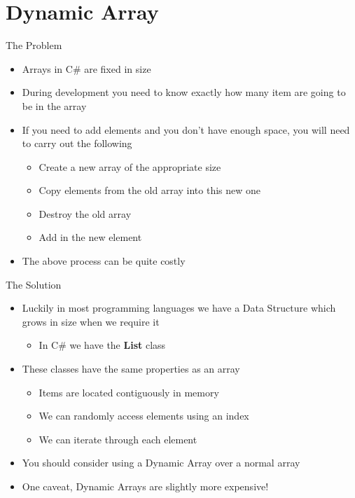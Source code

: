 \part{Dynamic Array}
\frame{\partpage}

\begin{frame}{The Problem}
	\begin{itemize}
		\pause \item Arrays in C\# are fixed in size
		\pause \item During development you need to know exactly how many item are going to be in the array
		\pause \item If you need to add elements and you don't have enough space, you will need to carry out the following
		\begin{itemize}
			\pause \item Create a new array of the appropriate size 
			\pause \item Copy elements from the old array into this new one
			\pause \item Destroy the old array
			\pause \item Add in the new element
		\end{itemize}
		\pause \item The above process can be quite costly
	\end{itemize}
\end{frame}

\begin{frame}{The Solution}
	\begin{itemize}
		\pause \item Luckily in most programming languages we have a Data Structure which grows in size when we require it 
		\begin{itemize}
			\pause \item In C\# we have the \textbf{List} class
		\end{itemize}
		\pause \item These classes have the same properties as an array
		\begin{itemize}
			\pause \item Items are located contiguously in memory 
			\pause \item We can randomly access elements using an index
			\pause \item We can iterate through each element
		\end{itemize}
		\pause \item You should consider using a Dynamic Array over a normal array
		\pause \item One caveat, Dynamic Arrays are slightly more expensive!
	\end{itemize}
\end{frame}

